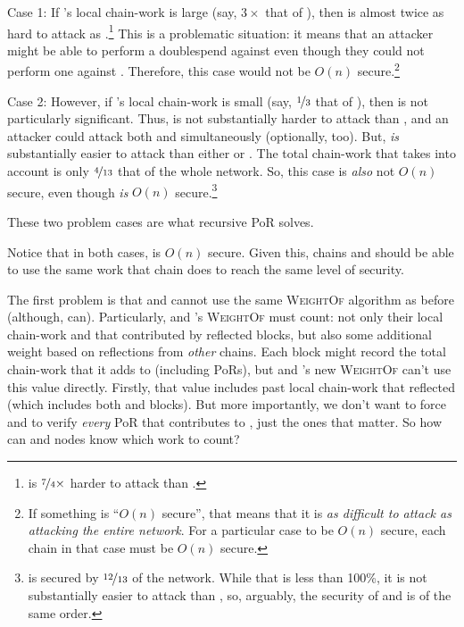 Case 1: If \cR's local chain-work is large (say, $3\times$ that of \cM), then \cM is almost twice as hard to attack as \cL.\footnote{
    \cM is $\nicefrac74\times$ harder to attack than \cL.
}
This is a problematic situation: it means that an attacker might be able to perform a doublespend against \cL even though they could not perform one against \cM.
Therefore, this case would not be $O(n)$ secure.\footnote{
    If something is ``$O(n)$ secure'', that means that it is \emph{as difficult to attack as attacking the entire network}.
    For a particular case to be $O(n)$ secure, each chain in that case must be $O(n)$ secure.
}

Case 2: However, if \cR's local chain-work is small (say, $\nicefrac13$ that of \cM), then \cR is not particularly significant.
Thus, \cM is not substantially harder to attack than \cL, and an attacker could attack both \cL and \cM simultaneously (optionally, \cR too).
But, \cR \emph{is} substantially easier to attack than either \cM or \cL.
The total chain-work that \cR takes into account is only $\nicefrac4{13}$ that of the whole network.
So, this case is \emph{also} not $O(n)$ secure, even though \cL \emph{is} $O(n)$ secure.\footnote{
    \cL is secured by $\nicefrac{12}{13}$ of the network.
    While that is less than 100\%, it is not substantially easier to attack than \cM, so, arguably, the security of \cL and \cM is of the same order.
}

These two problem cases are what recursive PoR solves.

Notice that in both cases, \cM is $O(n)$ secure.
Given this, chains \cL and \cR should be able to use the same work that chain \cM does to reach the same level of security.

The first problem is that \cL and \cR cannot use the same \textsc{WeightOf} algorithm as before (although, \cM can).
Particularly, \cL and \cR's \textsc{WeightOf} must count: not only their local chain-work and that contributed by reflected \cM blocks, but also some additional weight based on reflections from \emph{other} chains.
Each \cM block might record the total chain-work that it adds to \cM (including PoRs), but \cL and \cR's new \textsc{WeightOf} can't use this value directly.
Firstly, that value includes past local chain-work that reflected \cM (which includes both \cL and \cR blocks).
But more importantly, we don't want to force \cL and \cR to verify \emph{every} PoR that contributes to \cM, just the ones that matter.
So how can \cL and \cR nodes know which work to count?

